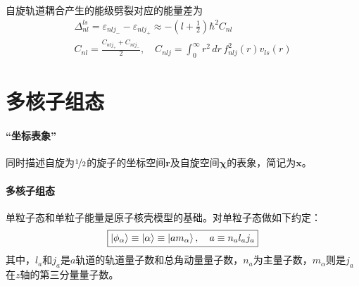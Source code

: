 自旋轨道耦合产生的能级劈裂对应的能量差为
\begin{align}
	\Delta_{nl}^{ls} = \varepsilon_{nlj_{-}} - \varepsilon_{nlj_{+}} \approx -(l + \frac{1}{2})\hbar^2 C_{nl} \\
	C_{nl} = \frac{C_{nlj_{+}} + C_{nlj_{-}}}{2},
	\quad
	C_{nlj} = \int_{0}^{\infty} r^2\, dr\, f_{nlj}^2(r) v_{ls}(r)
\end{align}

\section{多核子组态}
\paragraph*{“坐标表象”}
同时描述自旋为$\nicefrac{1}{2}$的旋子的坐标空间$\bm{r}$及自旋空间$\bm{\chi}$的表象，简记为$\bm{x}$。

\paragraph*{多核子组态}
单粒子态和单粒子能量是原子核壳模型的基础。对单粒子态做如下约定：
\begin{equation}\boxed{
	\ket{\phi_{\alpha}} \equiv \ket{\alpha} \equiv \ket{am_{\alpha}}, \quad a \equiv n_{a} l_{a} j_{a} \label{eq:sgl-part-stat}
}\end{equation}
其中，$l_a$和$j_a$是$a$轨道的轨道量子数和总角动量量子数，$n_a$为主量子数，$m_{\alpha}$则是$j_a$在$z$轴的第三分量量子数。





